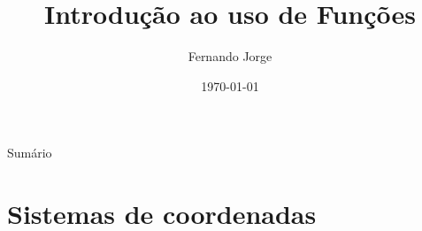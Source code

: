 \documentclass[aspectratio=169,xcolor=dvipsnames]{beamer}
\title[short title]{Introdução ao uso de Funções} %
\author[Fernando-Jorge] {Fernando Jorge}
\institute[NTU] %
{
  Escola Estadual Professor Lima Castro
}
\date{\today} %
\begin{document}
\begin{frame}
    \titlepage
\end{frame}

\begin{frame}{Sumário}
    \tableofcontents
\end{frame}

\section{Sistemas de coordenadas}
\end{document}
